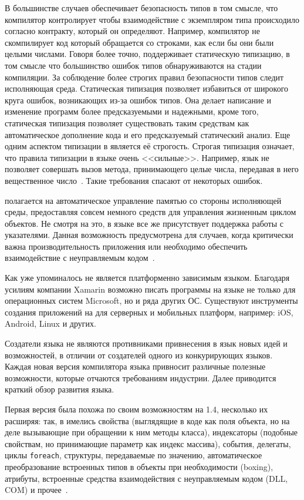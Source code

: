 В большинстве случаев \csharp{} обеспечивает безопасность типов в том смысле, что компилятор контролирует чтобы взаимодействие с экземпляром типа происходило согласно контракту, который он определяют.
Например, компилятор \csharp{} не скомпилирует код который обращается со строками, как если бы они были целыми числами.
Говоря более точно, \csharp{} поддерживает статическую типизацию, в том смысле что большинство ошибок типов обнаруживаются на стадии компиляции.
За соблюдение более строгих правил безопасности типов следит исполняющая среда.
Статическая типизация позволяет избавиться от широкого круга ошибок, возникающих из-за ошибок типов. 
Она делает написание и изменение программ более предсказуемыми и надежными, кроме того, статическая типизация позволяет существовать таким средствам как автоматическое дополнение кода и его предсказуемый статический анализ.
Еще одним аспектом типизации в \csharp{} является её строгость.
Строгая типизация означает, что правила типизации в языке очень <<сильные>>.
Например, язык не позволяет совершать вызов метода, принимающего целые числа, передавая в него вещественное число~\cite{albahari_2012_en}. 
Такие требования спасают от некоторых ошибок.

\csharp{} полагается на автоматическое управление памятью со стороны исполняющей среды, предоставляя совсем немного средств для управления жизненным циклом объектов.
Не смотря на это, в языке все же присутствует поддержка работы с указателями.
Данная возможность предусмотрена для случаев, когда критически важна производительность приложения или необходимо обеспечить взаимодействие с неуправляемым кодом~\cite{albahari_2012_en}. 

Как уже упоминалось \csharp{} не является платформенно зависимым языком.
Благодаря усилиям компании Xamarin возможно писать программы на языке \csharp{} не только для операционных систем Microsoft, но и ряда других ОС.
Существуют инструменты создания приложений на \csharp{} для серверных и мобильных платформ, например: iOS, Android, Linux и других.

Создатели языка \csharp{} не являются противниками привнесения в язык новых идей и возможностей, в отличии от создателей одного из конкурирующих языков.
Каждая новая версия компилятора языка привносит различные полезные возможности, которые отчаются требованиям индустрии. 
Далее приводится краткий обзор развития языка.

Первая версия \csharp{} была похожа по своим возможностям на \java{} 1.4, несколько их расширяя: так, в \csharp{} имелись свойства (выглядящие в коде как поля объекта, но на деле вызывающие при обращении к ним методы класса), индексаторы (подобные свойствам, но принимающие параметр как индекс массива), события, делегаты, циклы \lstinline!foreach!, структуры, передаваемые по значению, автоматическое преобразование встроенных типов в объекты при необходимости (boxing), атрибуты, встроенные средства взаимодействия с неуправляемым кодом (DLL, COM) и прочее~\cite{csharp_wiki_2013_ru}. 

